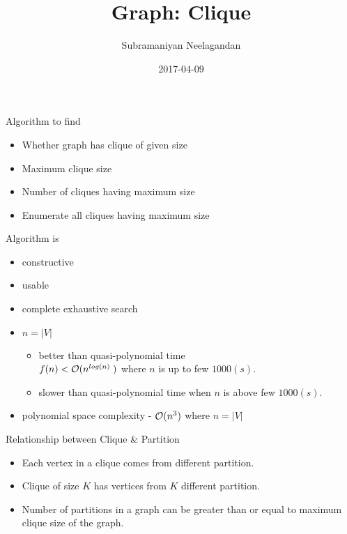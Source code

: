\documentclass[landscape]{slides}
\title{Graph: Clique}
\author{Subramaniyan Neelagandan}
\date{2017-04-09}
\begin{document}
\begin{slide}
	\begin{center}
		{\large Algorithm to find}
	\end{center}
	\begin{itemize}
		\setlength{\itemsep}{0pt}
		\setlength{\parskip}{0pt}
		\setlength{\parsep}{0pt}
		\item Whether graph has clique of given size
		\item Maximum clique size
		\item Number of cliques having maximum size
		\item Enumerate all cliques having maximum size
	\end{itemize}
\end{slide}

\begin{slide}
	\begin{center}
		{\large Algorithm is}
	\end{center}
	\begin{itemize}
		\setlength{\itemsep}{0pt}
		\setlength{\parskip}{0pt}
		\setlength{\parsep}{0pt}
		\item constructive
		\item usable
		\item complete exhaustive search
		\item {$n = |V|$}
		\begin{itemize}
			\item better than quasi-polynomial time \\
			 $ f(n) < \mathcal{O}(n\textsuperscript{{$log{(n)}$} })$ where $n$ is up to few $1000(s)$.
			 \item slower than quasi-polynomial time when $n$ is above few $1000(s)$.
		\end{itemize}
		\item polynomial space complexity - $\mathcal{O}(n\textsuperscript{3})$ where {$n = |V|$}
	\end{itemize}
\end{slide}

\begin{slide}
	\begin{center}
		{\large Relationship between Clique \& Partition}
	\end{center}
	\begin{itemize}
		\setlength{\itemsep}{0pt}
		\setlength{\parskip}{0pt}
		\setlength{\parsep}{0pt}
		\item Each vertex in a clique comes from different partition.
		\item Clique of size {$K$} has vertices from {$K$} different partition.
		\item Number of partitions in a graph can be greater than or equal to maximum clique size of the graph. 
	\end{itemize}
\end{slide}
\end{document}
